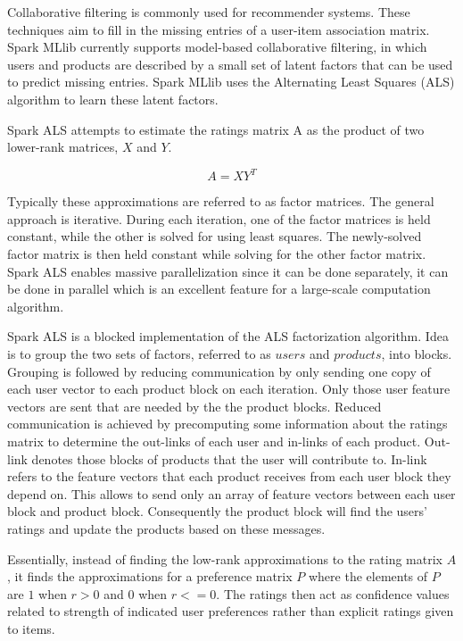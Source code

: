 \documentclass[main.tex]{thesis.tex}
\begin{document}
Collaborative filtering is commonly used for recommender systems.
These techniques aim to fill in the missing entries of a user-item association matrix.
Spark MLlib currently supports model-based collaborative filtering, in which users and products are described by a small set of latent factors that can be used to predict missing entries.
Spark MLlib uses the Alternating Least Squares (ALS) algorithm to learn these latent factors. \cite{spark14}

Spark ALS attempts to estimate the ratings matrix A as the product of two lower-rank matrices, $X$ and $Y$. \cite{als14}

\begin{equation}
A = XY^T
\end{equation}

Typically these approximations are referred to as factor matrices.
The general approach is iterative.
During each iteration, one of the factor matrices is held constant, while the other is solved for using least squares. The newly-solved factor matrix is then held constant while solving for the other factor matrix. \cite{als14}
Spark ALS enables massive parallelization since it can be done separately, it can be done in parallel which is an excellent feature for a large-scale computation algorithm. \cite{ryza15}

Spark ALS is a blocked implementation of the ALS factorization algorithm.
Idea is to group the two sets of factors, referred to as $users$ and $products$, into blocks.
Grouping is followed by reducing communication by only sending one copy of each user vector to each product block on each iteration.
Only those user feature vectors are sent that are needed by the the product blocks.
Reduced communication is achieved by precomputing some information about the ratings matrix to determine the out-links of each user and in-links of each product.
Out-link denotes those blocks of products that the user will contribute to.
In-link refers to the feature vectors that each product receives from each user block they depend on.
This allows to send only an array of feature vectors between each user block and product block.
Consequently the product block will find the users' ratings and update the products based on these messages. \cite{als14}

Essentially, instead of finding the low-rank approximations to the rating matrix $A$, it finds the approximations for a preference matrix $P$ where the elements of $P$ are $1$ when $r > 0$ and $0$ when $r <= 0$.
The ratings then act as confidence values related to strength of indicated user preferences rather than explicit ratings given to items. \cite{als14}
\end{document}
